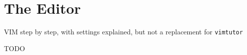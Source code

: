 \chapter{The Editor}

\begin{chapsummary}
VIM step by step, with settings explained, but not a replacement for \texttt{vimtutor}
\end{chapsummary}

TODO
